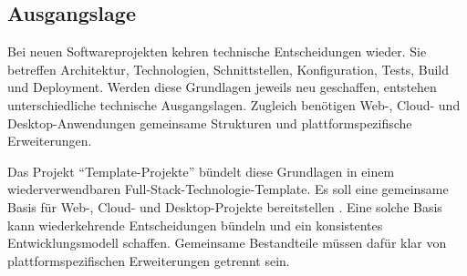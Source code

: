 \subsection{Ausgangslage}
\label{subsec:ausgangslage}

Bei neuen Softwareprojekten kehren technische Entscheidungen wieder. Sie
betreffen Architektur, Technologien, Schnittstellen, Konfiguration, Tests,
Build und Deployment.
Werden diese Grundlagen jeweils neu geschaffen, entstehen unterschiedliche
technische Ausgangslagen. Zugleich benötigen Web-, Cloud- und
Desktop-Anwendungen gemeinsame Strukturen und plattformspezifische
Erweiterungen.

Das Projekt \enquote{Template-Projekte} bündelt diese Grundlagen in einem
wiederverwendbaren Full-Stack-Technologie-Template. Es soll eine gemeinsame
Basis für Web-, Cloud- und Desktop-Projekte bereitstellen
\parencite{kleiveist2026template}.
Eine solche Basis kann wiederkehrende Entscheidungen bündeln und ein
konsistentes Entwicklungsmodell schaffen. Gemeinsame Bestandteile müssen dafür
klar von plattformspezifischen Erweiterungen getrennt sein.
